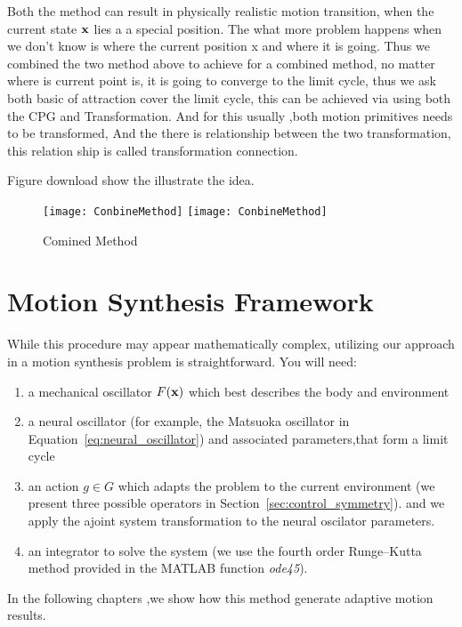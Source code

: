 Both the method can result in physically realistic motion transition, when the current state $\mathbf{x}$ lies a a special position.
The what more problem happens when we don't know is where the current position x and where it is going.
Thus we combined the two method above to achieve for a combined method,
no matter where is current point is, it is going to converge to the limit cycle, thus we ask both basic of attraction cover the limit cycle, this can be achieved via using both the CPG and Transformation.
And for this usually ,both motion primitives needs to be transformed,
And the there is relationship between the two transformation,  this relation ship is called transformation connection.

Figure download show the illustrate the idea.

\begin{figure}[!htbp]
  \begin{center}
    \leavevmode
    \ifpdf
      \texttt{[image: ConbineMethod]}
    \else
      \texttt{[image: ConbineMethod]}
    \fi
    \caption{Comined Method}
    \label{fig:Combine}
  \end{center}
\end{figure}

\section{Motion Synthesis Framework}
While this procedure may appear mathematically complex, utilizing our approach in a motion synthesis problem is straightforward. You will need:
\begin{enumerate}
\item a mechanical oscillator $F(\mathbf{x})$ which best describes the body and environment
\item a neural oscillator (for example, the Matsuoka oscillator in Equation~\ref{eq:neural_oscillator}) and associated parameters,that form a limit cycle

\item an action $g \in G$ which adapts the problem to the current environment (we present three possible operators in Section~\ref{sec:control_symmetry}). and we apply the ajoint system transformation to the neural oscilator parameters.

\item an integrator to solve the system (we use the fourth order Runge--Kutta method provided in the {MATLAB} function \emph{ode45}).
\end{enumerate}
In the following chapters ,we show how this method generate adaptive motion results.


